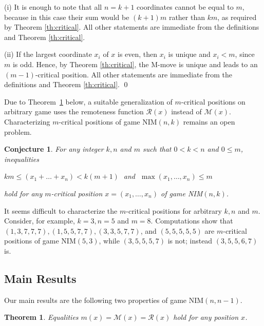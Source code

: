 \documentclass{article}
\newtheorem{theorem}{Theorem}
\newtheorem{conjecture}{Conjecture}
\theoremstyle{definition}
\def\R{\mathcal{R}}
\def\M{\mathcal{M}}
\begin{document}
\proof 
(i) 
It is enough to note that 
all $n=k+1$  coordinates 
cannot be equal to  $m$, because 
in this case their sum would be  $(k+1)m$ 
rather than  $km$, 
as required by Theorem \ref{th:critical}.  
All other statements are immediate 
from the definitions and Theorem \ref{th:critical}. 

\medskip

(ii)
If the largest coordinate $x_i$ of $x$  is even, 
then  $x_i$  is unique and  $x_i < m$, 
since  $m$  is odd. 
Hence, by Theorem \ref{th:critical}, 
the M-move is unique and leads to 
an $(m-1)$-critical position. 
All other statements are immediate 
from the definitions and Theorem \ref{th:critical}. 
\qed 


\bigskip 

Due to Theorem~\ref{th:main} below, a suitable generalization 
of $m$-critical positions on arbitrary game uses 
the remoteness function  $\R(x)$ instead of $\M(x)$. 
Characterizing  $m$-critical positions of game  NIM$(n,k)$ 
remains an open problem. 

\begin{conjecture} 
For any integer $k,n$ and $m$ 
such that  $0 < k < n$  and $0 \leq m$, inequalities 

\medskip 

$km \leq (x_1 + \dots + x_n) < k(m+1)\;$  
and 
$\; \max(x_1, \dots, x_n) \leq m$  

\medskip 
\noindent 
hold for any $m$-critical position   
$x =(x_1, \dots, x_n)$  of game NIM$(n,k)$. 
\end{conjecture} 

It seems difficult to characterize 
the $m$-critical positions for 
arbitrary $k,n$ and $m$. 
Consider, for example,  
$k = 3, n = 5$ and $m = 8$. 
Computations show that 
$(1,3,7,7,7), (1,5,5,7,7), (3,3,5,7,7)$, and  $(5,5,5,5,5)$ 
are $m$-critical positions of game  NIM$(5,3)$, 
while  $(3,5,5,5,7)$  is not; instead  $(3,5,5,6,7)$  is. 

\subsection{Main Results} 

Our main results are 
the following two properties of game NIM$(n,n-1)$. 

\begin{theorem}
\label{th:main}
Equalities  $m(x) = \M(x) = \R(x)$ 
hold for any position  $x$. 
\end{theorem}
\end{document}
